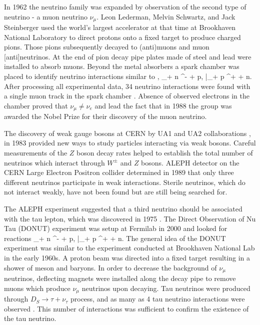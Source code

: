 In 1962 the neutrino family was expanded by observation of the second type of neutrino - 
a muon neutrino $\nu_\mu$.  Leon Lederman, Melvin Schwartz, and Jack Steinberger used 
the world's largest accelerator at that time at Brookhaven National Laboratory to direct protons onto 
a fixed target to produce charged pions. Those pions subsequently decayed to 
(anti)muons and muon [anti]neutrinos. At the end of pion decay pipe plates made of steel 
and lead were installed to absorb muons. Beyond the metal absorbers a spark chamber was 
placed to identify neutrino interactions similar to ,
\be
\nu_\mu + n \rightarrow \mu^- + p,\qquad
\bar{\nu}_\mu + p \rightarrow \mu^+ + n.
\ee
After processing all experimental data, 34 neutrino interactions were found with 
a single muon track in the spark chamber \cite{danby}. Absence of observed electrons in 
the chamber proved that $\nu_\mu \ne \nu_e$ and lead the fact that in 1988 the group was awarded 
the Nobel Prize for their discovery of the muon neutrino.

The discovery of weak gauge bosons at CERN by UA1 and UA2 collaborations \cite{arnison}, 
\cite{arnison2} in 1983 provided new ways to study particles interacting via weak bosons. 
Careful measurements of the $Z$ boson decay rates helped to establish the total number 
of neutrinos which interact through $W^\pm$ and $Z$ bosons. ALEPH detector on the 
CERN Large Electron Positron collider determined \cite{decamp} in 1989 that only 
three different neutrinos participate in weak interactions. Sterile neutrinos, which 
do not interact weakly, have not been found but are still being searched for.

The ALEPH experiment suggested that a third neutrino should be associated with the tau 
lepton, which was discovered in 1975 \cite{perl}. The Direct Observation of Nu Tau (DONUT) 
experiment was setup at Fermilab in 2000 and looked for reactions
\be
\nu_\tau + n \rightarrow \tau^- + p,\qquad
\bar{\nu}_\tau + p \rightarrow \tau^+ + n.
\ee
The general idea of the DONUT experiment was similar to the experiment conducted at 
Brookhaven National Lab in the early 1960s. A proton beam was directed into a fixed 
target resulting in a shower of meson and baryons. In order to decrease the background 
of $\nu_\mu$ neutrinos, deflecting magnets were installed along the decay pipe to remove 
muons which produce $\nu_\mu$ neutrinos upon decaying. Tau neutrinos were produced through 
$D_S \rightarrow \tau + \nu_\tau$ process, and as many as 4 tau neutrino interactions 
were observed \cite{kodama}. This number of interactions was sufficient to confirm 
the existence of the tau neutrino.

